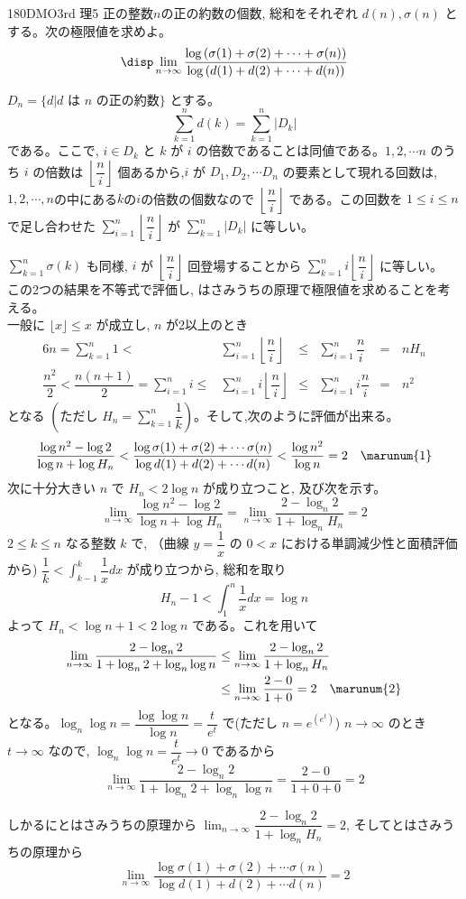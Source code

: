 \begin{prob}{180}{}{DMO3rd 理5}
 正の整数$n$の正の約数の個数, 総和をそれぞれ $d(n), \sigma (n)$ とする。次の極限値を求めよ。
 \[\disp\lim_{n\to \infty}\dfrac{\log{(\sigma(1) +\sigma(2) +\cdots +\sigma (n))}}{\log{(d(1)+d(2)+\cdots +d(n))}}\]
\end{prob}
$D_n=\{d| \mbox{$d$ は $n$ の正の約数}\}$ とする。
\[\displaystyle\sum_{k=1}^n d(k) = \displaystyle\sum_{k=1}^n|D_k|\] である。ここで, $i\in D_k$ と $k$ が $i$ の倍数であることは同値である。$1,2,\cdots n$ のうち $i$ の倍数は $\left\lfloor\dfrac{n}{i}\right\rfloor$ 個あるから,$i$ が $D_1, D_2, \cdots D_n$ の要素として現れる回数は, $1,2,\cdots, n$の中にある$k$の$i$の倍数の個数なので $\left\lfloor\dfrac{n}{i}\right\rfloor$ である。この回数を $1\le i\le n$ で足し合わせた $\displaystyle\sum_{i=1}^n \left\lfloor\dfrac{n}{i}\right\rfloor$ が $\displaystyle\sum_{k=1}^n |D_k|$ に等しい。

$\displaystyle\sum_{k=1}^n \sigma (k)$ も同様, $i$ が $\left\lfloor\dfrac{n}{i}\right\rfloor$ 回登場することから $\displaystyle\sum_{k=1}^n i\left\lfloor\dfrac{n}{i}\right\rfloor$ に等しい。 \\
この2つの結果を不等式で評価し, はさみうちの原理で極限値を求めることを考える。\\
一般に $\lfloor x\rfloor\le x$ が成立し, $n$ が2以上のとき
\begin{alignat*}{6}
n=\sum_{k=1}^n 1 < &\sum_{i=1}^n \left\lfloor\dfrac{n}{i}\right\rfloor& \le &\sum_{i=1}^n \dfrac{n}{i}& =&\,nH_n\\
\dfrac{n^2}{2}<\dfrac{n(n+1)}{2}=\sum_{i=1}^n i \le &\sum_{i=1}^n i\left\lfloor\dfrac{n}{i}\right\rfloor& \le &\sum_{i=1}^n i\dfrac{n}{i}& =&\,n^2
\end{alignat*}
となる $(\text{ただし}\,\,H_n=\displaystyle\sum_{k=1}^n\dfrac{1}{k})$。そして,次のように評価が出来る。
\begin{align*}
\dfrac{\log{n^2}-\log{2}}{\log{n}+\log{H_n}} < \dfrac{\log{\sigma(1) +\sigma (2)+\cdots \sigma (n)}}{\log{d(1)+d(2)+\cdots d(n)}} < \dfrac{\log{n^2}}{\log{n}} = 2 \quad \marunum{1}
\end{align*}
次に十分大きい $n$ で $H_n<2\log{n}$ が成り立つこと, 及び次を示す。
\[ \lim_{n\to\infty}\dfrac{\log{n^2}-\log{2}}{\log{n}+\log{H_n}}=\lim_{n\to\infty}\dfrac{2-\log_n{2}}{1+\log_n{H_n}}=2 \]
$2\le k\le n$ なる整数 $k$ で, （曲線 $y=\dfrac{1}{x}$ の $0<x$ における単調減少性と面積評価から) $\dfrac{1}{k}<\displaystyle\int_{k-1}^{k} \dfrac{1}{x} dx$ が成り立つから, 総和を取り
\[ H_n-1<\displaystyle\int_1^{n}\dfrac{1}{x} dx=\log{n} \]
よって $H_n<\log{n}+1<2\log{n}$ である。これを用いて
\begin{align*}
\lim_{n\to\infty}\dfrac{2-\log_n{2}}{1+\log_n{2}+\log_n{\log{n}}}&\le\lim_{n\to\infty}\dfrac{2-\log_n{2}}{1+\log_n{H_n}}\\
&\le\lim_{n\to\infty}\dfrac{2-0}{1+0}=2 \quad \marunum{2}
\end{align*}
となる。$\log_n{\log{n}}=\dfrac{\log{\log{n}}}{\log{n}}=\dfrac{t}{e^t}$ で(ただし $n= e^{(e^t)}$) $n\rightarrow \infty$ のとき $t\rightarrow \infty$ なので, $\log_n{\log{n}}=\dfrac{t}{e^t}\rightarrow 0$ であるから
\[ \lim_{n\to\infty}\dfrac{2-\log_n{2}}{1+\log_n{2}+\log_n{\log{n}}}=\dfrac{2-0}{1+0+0}=2 \]

しかるにとはさみうちの原理から $\displaystyle\lim_{n\to\infty}\dfrac{2-\log_n{2}}{1+\log_n{H_n}}=2$, そしてとはさみうちの原理から
\[\displaystyle\lim_{n\to\infty }\dfrac{\log{\sigma(1) +\sigma (2)+\cdots \sigma (n)}}{\log{d(1)+d(2)+\cdots d(n)}}=2\]
